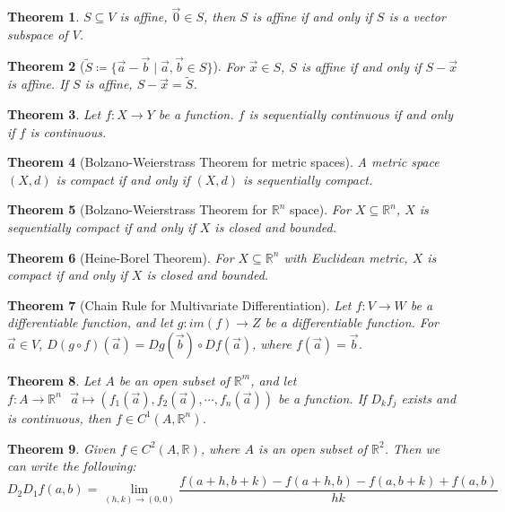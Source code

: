 \documentclass[11pt]{article}
\theoremstyle{break}
\theoremstyle{break}
\newtheorem{thm}{Theorem}[section]
\newcommand{\R}{\mathbb{R}}
\begin{document}
\begin{thm}
$S\subseteq V$ is affine, $\vec{0}\in S$, then $S$ is affine if and only if $S$ is a vector subspace of $V$.
\end{thm}

\begin{thm}[$\widetilde{S} \coloneqq \{\vec{a}-\vec{b} \mid \vec{a},\vec{b}\in S\}$]
For $\vec{x}\in S$, $S$ is affine if and only if $S - \vec{x}$ is affine. If $S$ is affine, $S - \vec{x} = \widetilde{S}$.
\end{thm}

\begin{thm}
Let $f:X\to Y$ be a function. $f$ is sequentially continuous if and only if $f$ is continuous.
\end{thm}

\begin{thm}[Bolzano-Weierstrass Theorem for metric spaces]
A metric space $(X,d)$ is compact if and only if $(X,d)$ is sequentially compact.
\end{thm}

\begin{thm}[Bolzano-Weierstrass Theorem for $\R^n$ space]
For $X \subseteq \R^n$, $X$ is sequentially compact if and only if $X$ is closed and bounded.
\end{thm}

\begin{thm}[Heine-Borel Theorem]
For $X \subseteq \R^n$ with Euclidean metric, $X$ is compact if and only if $X$ is closed and bounded. 
\end{thm}

\begin{thm}[Chain Rule for Multivariate Differentiation]
Let $f:V \to W$ be a differentiable function, and let $g:im(f) \to Z$ be a differentiable function. For $\vec{a}\in V$, $D(g\circ f)(\vec{a}) = Dg(\vec{b})\circ Df(\vec{a})$, where $f(\vec{a}) = \vec{b}$.
\end{thm}

\begin{thm}
Let $A$ be an open subset of $\R^m$, and let $f:A \to \R^n \ \ \ \vec{a}\mapsto (f_1(\vec{a}),f_2(\vec{a}),\cdots, f_n(\vec{a}))$ be a function. If $D_kf_j$ exists and is continuous, then $f \in C^1(A,\R^n)$.
\end{thm}

\begin{thm}
Given $f\in C^2(A,\R)$, where $A$ is an open subset of $\R^2$. Then we can write the following: $$D_2D_1f(a,b) = \lim_{(h,k)\to (0,0)} \frac{f(a+h,b+k)-f(a+h,b)-f(a,b+k)+f(a,b)}{hk}$$
\end{thm}
\end{document}
